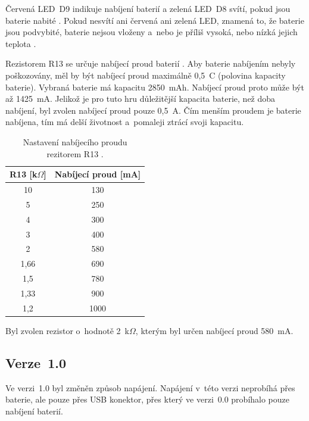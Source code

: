   Červená LED~D9 indikuje nabíjení baterií a  zelená LED~D8 svítí, pokud jsou baterie nabité \cite{TP4056_datasheet}. 
  Pokud nesvítí ani červená ani zelená LED, znamená to, že baterie jsou podvybité, baterie nejsou vloženy a~nebo je příliš vysoká, 
  nebo nízká jejich teplota \cite{TP4056_datasheet}.

  Rezistorem R13 se určuje nabíjecí proud baterií \cite{TP4056_datasheet}. Aby baterie nabíjením nebyly poškozovány, měl by být nabíjecí 
  proud maximálně 0,5~C (polovina kapacity baterie). Vybraná baterie má kapacitu 2850~mAh. Nabíjecí proud proto může být až 1425~mA. 
  Jelikož je pro tuto hru důležitější kapacita baterie, než doba nabíjení, byl zvolen nabíjecí proud pouze 0,5~A. Čím menším proudem 
  je baterie nabíjena, tím má delší životnost a~pomaleji ztrácí svoji kapacitu.

  \begin{table}[!h]
    \caption{Nastavení nabíjecího proudu rezitorem R13 \cite{TP4056_datasheet}.}
    \begin{center}
      \begin{tabular}{|c|c|}
          \hline
          R13 [k$\Omega$] & Nabíjecí proud [mA] \\
          \hline
          10      & 130 \\
          \hline
          5       & 250 \\
          \hline
          4       & 300 \\
          \hline
          3       & 400 \\
          \hline
          2       & 580 \\
          \hline
          1,66    & 690 \\
          \hline
          1,5     & 780 \\
          \hline
          1,33    & 900 \\
          \hline
          1,2     & 1000 \\
          \hline
      \end{tabular}  
    \end{center}
  \end{table}

  Byl zvolen rezistor o~hodnotě 2~k$\Omega$, kterým byl určen nabíjecí proud 580~mA. 

  \subsection{Verze~1.0}
  Ve verzi~1.0 byl změněn způsob napájení. Napájení v~této verzi neprobíhá přes baterie, ale pouze přes USB konektor, přes 
  který ve verzi~0.0 probíhalo pouze nabíjení baterií. 


